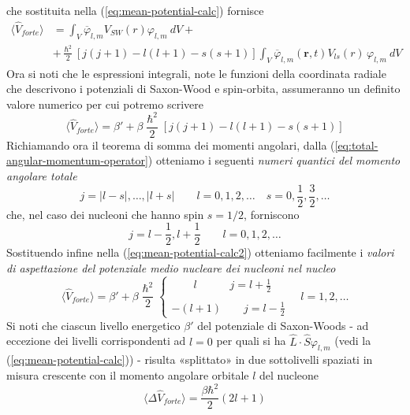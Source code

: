 che sostituita nella (\ref{eq:mean-potential-calc}) fornisce
\begin{align*}
	\langle \hat{V}_{forte} \rangle & = \int_{V} \overline{\varphi}_{l,m} V_{SW}(r)\varphi_{l,m} \ dV + \\
	&+\frac{\hslash^{2}}{2} [j(j+1) - l(l+1) -s(s+1) ]
	\int_{V}\overline{\varphi}_{l,m}(\bm{r},t) V_{ls}(r)\,  \varphi_{l,m} \ dV
\end{align*}
Ora si noti che le espressioni integrali, note le funzioni della coordinata radiale che descrivono i potenziali di Saxon-Wood e spin-orbita, assumeranno un definito valore numerico per cui potremo scrivere
\begin{equation}
	\langle \hat{V}_{forte} \rangle = \beta' + \beta\frac{\hslash^{2}}{2} [j(j+1) - l(l+1) -s(s+1) ]
	\label{eq:mean-potential-calc2}
\end{equation}
Richiamando ora il teorema di somma dei momenti angolari, dalla (\ref{eq:total-angular-momentum-operator}) otteniamo i seguenti \emph{numeri quantici del momento angolare totale}
\[
	j = |l-s|, \dots , |l+s| \qquad l = 0,1,2,\dots \quad s = 0, \frac{1}{2}, \frac{3}{2}, \dots
\]
che, nel caso dei nucleoni che hanno spin $s=1/2$, forniscono
\[
	j = l - \frac{1}{2}, l + \frac{1}{2} \qquad l = 0,1,2,\dots
\]
Sostituendo infine nella (\ref{eq:mean-potential-calc2}) otteniamo facilmente i \emph{valori di aspettazione del potenziale medio nucleare dei nucleoni nel nucleo}
\begin{equation}
	\langle \hat{V}_{forte} \rangle = \beta' + \beta\frac{\hslash^{2}}{2}
	\begin{cases}
		\qquad l \qquad \quad j = l+\frac{1}{2} \\ \\
		-(l+1) \qquad j = l -\frac{1}{2}
	\end{cases}
	\quad l = 1,2,\dots
	\label{eq:expected-value-shell-model-potential}
\end{equation}
Si noti che ciascun livello energetico $\beta'$ del potenziale di Saxon-Woods - ad eccezione dei livelli corrispondenti ad $l=0$ per quali si ha $\hat{L} \cdot \hat{S} \varphi_{l,m}$ (vedi la (\ref{eq:mean-potential-calc})) - risulta «splittato» in due sottolivelli spaziati in misura crescente con il momento angolare orbitale $l$ del nucleone
\begin{equation}
	\langle \Delta \hat{V}_{forte} \rangle = \frac{\beta \hbar^{2}}{2}(2l+1)
	\label{eq:saxon-woods-potential-energy-levels-splitting}
\end{equation}
